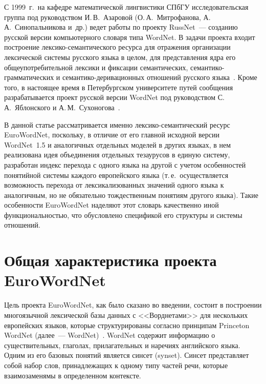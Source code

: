 \begin{multicols}{2}
{}

     
     С 1999~г.\ на кафедре математической лингвистики СПбГУ 
исследовательская группа под руководством И.\,В.~Азаровой 
(О.\,А.~Митрофанова, А.\,А.~Синопальникова и~др.) ведет работы по проекту 
RussNet~--- созданию русской версии компьютерного словаря типа WordNet. В 
задачи проекта входит построение лек\-си\-ко-се\-ман\-ти\-че\-ско\-го %
ресурса для 
отражения организации лексической сис\-те\-мы русского языка в целом, для 
представления ядра его общеупотребительной лексики и фиксации 
семантических, се\-ман\-ти\-ко-грам\-ма\-ти\-че\-ских и се\-ман\-ти\-ко-де\-ри\-ва\-ци\-он\-ных 
отношений русского языка~\cite{3koz}. Кроме того, в настоящее время в 
Петербургском университете путей сообщения разрабатывается проект 
русской версии WordNet под руководством С.\,А.~Яблонского и 
А.\,М.~Сухоногова~\cite{6koz}. 
     
     В данной статье рассматривается именно лексико-се\-ман\-ти\-че\-ский ресурс 
EuroWordNet, поскольку, в отличие от его главной исходной версии 
WordNet~1.5 и аналогичных отдельных моделей в других языках, в нем 
реализована идея объединения отдельных тезаурусов в единую систему, 
разработан индекс перехода с одного языка на другой с учетом особенностей 
понятийной системы каждого европейского языка (т.\,е.\ осуществляется 
возможность перехода от лексикализованных значений одного языка к 
аналогичным, но не обязательно тождественным понятиям другого языка). 
Такие особенности EuroWordNet наделяют этот словарь качественно иной 
функциональностью, что обусловлено спецификой его структуры и системы 
отношений.

\section{Общая характеристика проекта EuroWordNet}

     Цель проекта EuroWordNet, как было сказано во введении, состоит в 
построении многоязычной лексической базы данных с <<Ворднетами>> для 
нескольких европейских языков, которые структурированы согласно 
принципам Princeton WordNet (далее~--- WordNet)~\cite{4koz}. WordNet 
содержит информацию о существительных, глаголах, прилагательных и 
наречиях английского языка. Одним из его базовых понятий является синсет 
(synset). Синсет представляет собой набор слов, принадлежащих к одному типу 
частей речи, которые взаимозаменямы в определенном контексте.
     

\end{multicols}
